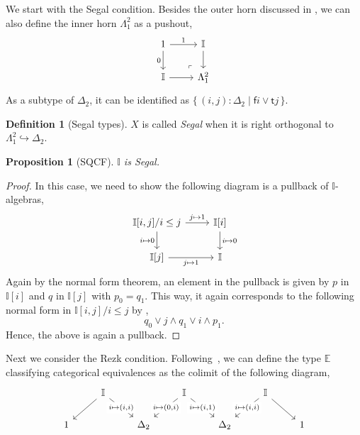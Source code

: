 \documentclass[12pt]{amsart}
\newtheorem{proposition}[theorem]{Proposition}
\theoremstyle{definition}
\newtheorem{definition}[theorem]{Definition}
\newcommand{\mbb}[1]{\mathbb{#1}}
\newcommand{\I}{\mbb I}
\newcommand{\ms}[1]{\mathsf{#1}}
\newcommand{\scomp}[2]{\{\,#1\mid#2\,\}}
\newcommand{\hook}{\hookrightarrow}
\begin{document}
We start with the Segal condition. Besides the outer horn discussed in , we can also define the inner horn $\Lambda^2_1$ as a pushout,
\[
  \begin{tikzcd}
    1 \ar[d, "0"'] \ar[r, "1"] & \I \ar[d] \\
    \I \ar[r] & \Lambda^2_1
    \arrow["\lrcorner"{anchor=center, pos=0.125, rotate=180}, draw=none, from=2-2, to=1-1]
  \end{tikzcd}
\]
As a subtype of $\Delta_2$, it can be identified as $\scomp{(i,j) : \Delta_2}{\ms fi \vee \ms tj}$.

\begin{definition}[Segal types]
  $X$ is called \emph{Segal} when it is right orthogonal to $\Lambda^2_1 \hook \Delta_2$.
\end{definition}


\begin{proposition}[SQCF]
  $\I$ is Segal.
\end{proposition}
\begin{proof}
  In this case, we need to show the following diagram is a pullback of $\I$-algebras, 
  \[
  \begin{tikzcd}
    \I[i,j]/i\le j \ar[r, "j \mapsto 1"] \ar[d, "i \mapsto 0"'] & \I[i] \ar[d, "i \mapsto 0"] \\
    \I[j] \ar[r, "j \mapsto 1"'] & \I
  \end{tikzcd}
  \]
  Again by the normal form theorem, an element in the pullback is given by $p$ in $\I[i]$ and $q$ in $\I[j]$ with $p_0 = q_1$. This way, it again corresponds to the following normal form in $\I[i,j]/i \le j$ by ,
  \[ q_0 \vee j \wedge q_1 \vee i \wedge p_1. \]
  Hence, the above is again a pullback.
\end{proof}

Next we consider the Rezk condition. Following~\cite{buchholtz2021synthetic}, we can define the type $\mbb E$ classifying categorical equivalences as the colimit of the following diagram,
\[
\begin{tikzcd}
	& \I && \I && \I \\
	1 && {\Delta_2} && {\Delta_2} && 1
	\arrow[from=1-2, to=2-1]
	\arrow["{i \mapsto (i,i)}"{description}, from=1-2, to=2-3]
	\arrow["{i \mapsto (0,i)}"{description}, from=1-4, to=2-3]
	\arrow["{i \mapsto (i,1)}"{description}, from=1-4, to=2-5]
	\arrow["{i \mapsto (i,i)}"{description}, from=1-6, to=2-5]
	\arrow[from=1-6, to=2-7]
\end{tikzcd}
\]
\end{document}
